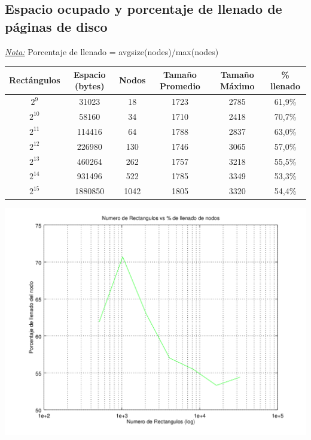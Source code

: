 \documentclass[letterpaper,10pt]{article}
\begin{document}
	\subsection{Espacio ocupado y porcentaje de llenado de páginas de disco}

	\underline{\textit{Nota:}} Porcentaje de llenado = avgsize(nodes)/max(nodes)

	\begin{center}

		\begin{tabular}{|c|c|c|c|c|c|}
			\hline
			Rectángulos	& Espacio (bytes) & Nodos & Tamaño Promedio & Tamaño Máximo & \% llenado\\
			\hline
			$2^{9}$ 	& 31023 & 18 & 1723 & 2785 & 61,9\%\\
			\hline
			$2^{10}$ 	& 58160 & 34 & 1710 & 2418 & 70,7\%\\
			\hline
			$2^{11}$ 	& 114416 & 64 & 1788 & 2837 & 63,0\%\\
			\hline
			$2^{12}$ 	& 226980 & 130 & 1746 & 3065 & 57,0\%\\
			\hline
			$2^{13}$ 	& 460264 & 262 & 1757 & 3218 & 55,5\%\\
			\hline
			$2^{14}$ 	& 931496 & 522 & 1785 & 3349 & 53,3\%\\
			\hline
			$2^{15}$ 	& 1880850 & 1042 & 1805 & 3320 & 54,4\%\\
			\hline
		\end{tabular}

		\includegraphics[width=0.75\textheight]{fig2.png}
	\end{center}
\end{document}
